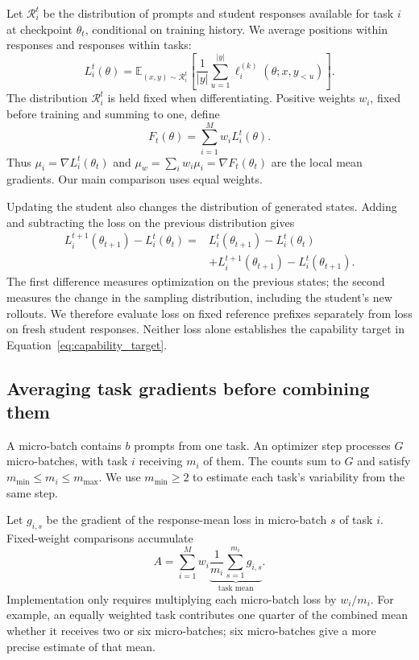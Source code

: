 Let $\mathcal R_i^t$ be the distribution of prompts and student responses
available for task $i$ at checkpoint $\theta_t$, conditional on training
history. We average positions within responses and responses within tasks:
\begin{equation}
    L_i^t(\theta)=
    \mathbb E_{(x,y)\sim\mathcal R_i^t}
    \left[\frac1{|y|}\sum_{u=1}^{|y|}
    \ell_i^{(k)}(\theta;x,y_{<u})\right].
    \label{eq:local_task_loss}
\end{equation}
The distribution $\mathcal R_i^t$ is held fixed when differentiating.
Positive weights $w_i$, fixed before training and summing to one, define
\begin{equation}
    F_t(\theta)=\sum_{i=1}^M w_iL_i^t(\theta).
    \label{eq:fixed_multitask_objective}
\end{equation}
Thus $\mu_i=\nabla L_i^t(\theta_t)$ and
$\mu_w=\sum_iw_i\mu_i=\nabla F_t(\theta_t)$ are the local mean
gradients. Our main comparison uses equal weights.

Updating the student also changes the distribution of generated states.
Adding and subtracting the loss on the previous distribution gives
\begin{equation}
\begin{split}
 L_i^{t+1}(\theta_{t+1})-L_i^t(\theta_t)
 ={}&L_i^t(\theta_{t+1})-L_i^t(\theta_t)\\
 &+L_i^{t+1}(\theta_{t+1})-L_i^t(\theta_{t+1}).
\end{split}
\label{eq:policy_drift}
\end{equation}
The first difference measures optimization on the previous states; the
second measures the change in the sampling distribution, including the
student's new rollouts. We therefore evaluate loss on fixed reference
prefixes separately from loss on fresh student responses. Neither loss
alone establishes the capability target in Equation~\ref{eq:capability_target}.

\subsection{Averaging task gradients before combining them}

A micro-batch contains $b$ prompts from one task. An optimizer step processes
$G$ micro-batches, with task $i$ receiving $m_i$ of them. The counts sum to
$G$ and satisfy $m_{\min}\leq m_i\leq m_{\max}$. We use
$m_{\min}\geq2$ to estimate each task's variability from the same step.

Let $g_{i,s}$ be the gradient of the response-mean loss in micro-batch $s$
of task $i$. Fixed-weight comparisons accumulate
\begin{equation}
    A=\sum_{i=1}^M w_i
       \underbrace{\frac1{m_i}\sum_{s=1}^{m_i}g_{i,s}}_{\text{task mean}}.
    \label{eq:batch_gradient_observation}
\end{equation}
Implementation only requires multiplying each micro-batch loss by $w_i/m_i$.
For example, an equally weighted task contributes one quarter of the
combined mean whether it receives two or six micro-batches; six
micro-batches give a more precise estimate of that mean.

